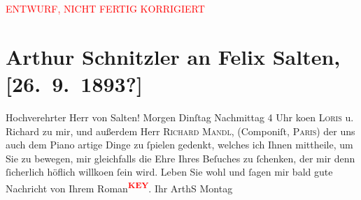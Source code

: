 
\begin{center}
            \textcolor{red}{ENTWURF, NICHT FERTIG KORRIGIERT}
                      \end{center}
            
         
         \renewcommand{\erwaehntePersonen}{Personen: Richard Beer-Hofmann, Hugo von Hofmannsthal, Richard Mandl, Felix Salten}
         \renewcommand{\erwaehnteOrte}{Orte: Paris, Wien}
         \renewcommand{\erwaehnteWerke}{}
               \section[Arthur Schnitzler an Felix Salten, {[}26. 9. 1893?{]}]{ Arthur Schnitzler an Felix Salten, {[}26. 9. 1893?{]}}\nopagebreak{}\rehead{ }\begin{ledgroupsized}[t]{13cm}\normalsize\beginnumbering \toendnotes[C]{\smallbreak\pagebreak[2]} 
\toendnotes[C]{\smallbreak}\pstart
           \noindent{}{\pb}Hochverehrter Herr von
                  Salten!  Morgen Dinſtag{ }Nachmittag 4 Uhr ko{\geminationm}en \textsc{Loris} u. Richard zu mir, und außerdem Herr \textsc{Richard Mandl}, (Componiſt, \textsc{Paris}) {\pb}der uns auch dem Piano
               artige Dinge zu ſpielen gedenkt, welches ich Ihnen mittheile, um Sie zu bewegen, mir
               gleichfalls die Ehre Ihres Beſuches zu ſchenken, der mir denn {\pb}ſicherlich höflich willko{\geminationm}en ſein wird. \pend
           \pstart
           Leben Sie wohl und ſagen mir bald gute Nachricht von Ihrem Roman\textcolor{red}{\textsuperscript{\textbf{KEY}}}. \pend
           \pstart Ihr \spacefill\mbox{ArthS}\pend{}\pstart
           \raggedleft{}Montag\pend
           
         
         \endnumbering{}\end{ledgroupsized}\begin{anhang}\end{anhang}\newcommand{\dateiname}{L02962}\newcommand{\titel}{Arthur Schnitzler an Felix Salten, [26. 9. 1893?]}\newcommand{\editorInnen}{Martin Anton Müller und Laura Untner}
      